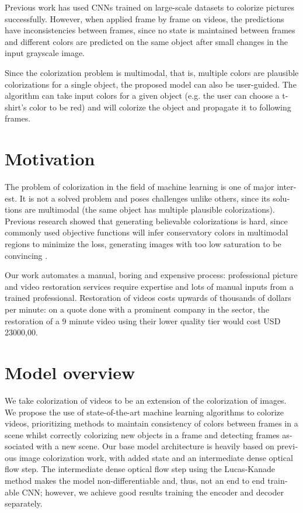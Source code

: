 \documentclass[12pt,openright,twoside,a4paper,english]{abntex2}
\begin{document}
\begin{otherlanguage}{english}
Previous work \cite{colorful} has used CNNs trained on large-scale datasets to colorize pictures successfully. However, when applied frame by frame on videos, the predictions have inconsistencies between frames, since no state is maintained between frames and different colors are predicted on the same object after small changes in the input grayscale image.

Since the colorization problem is multimodal, that is, multiple colors are plausible colorizations for a single object, the proposed model can also be user-guided. The algorithm can take input colors for a given object (e.g. the user can choose a t-shirt's color to be red) and will colorize the object and propagate it to following frames.

\section{Motivation} \label{sec:Motivation}
The problem of colorization in the field of machine learning is one of major interest. It is not a solved problem and poses challenges unlike others, since its solutions are multimodal (the same object has multiple plausible colorizations). Previous research showed that generating believable colorizations is hard, since commonly used objective functions will infer conservatory colors in multimodal regions to minimize the loss, generating images with too low saturation to be convincing \cite{colorful}.

Our work automates a manual, boring and expensive process: professional picture and video restoration services require expertise and lots of manual inputs from a trained professional. Restoration of videos costs upwards of thousands of dollars per minute: on a quote done with a prominent company in the sector, the restoration of a 9 minute video using their lower quality tier would cost USD 23000,00.

\section{Model overview}

We take colorization of videos to be an extension of the colorization of images. We propose the use of state-of-the-art machine learning algorithms to colorize videos, prioritizing methods to maintain consistency of colors between frames in a scene whilst correctly colorizing new objects in a frame and detecting frames associated with a new scene. Our base model architecture is heavily based on previous image colorization work, with added state and an intermediate dense optical flow step. The intermediate dense optical flow step using the Lucas-Kanade method makes the model non-differentiable and, thus, not an end to end trainable CNN; however, we achieve good results training the encoder and decoder separately.


\end{otherlanguage}
\end{document}
